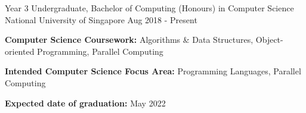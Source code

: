

\begin{cventries}

  \cventry
    {Year 3 Undergraduate, Bachelor of Computing (Honours) in Computer Science} %
    {National University of Singapore} %
    {} %
    {Aug 2018 - Present} %
    {
      \begin{cvitems} %
        \item {\textbf{Computer Science Coursework:} Algorithms \& Data Structures, Object-oriented Programming, Parallel Computing}
        \item {\textbf{Intended Computer Science Focus Area:} Programming Languages, Parallel Computing}
        \item {\textbf{Expected date of graduation:} May 2022}
      \end{cvitems}
    }

\end{cventries}

